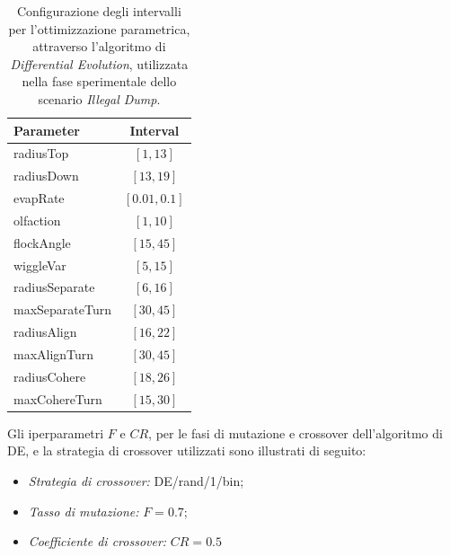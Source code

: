 \begin{table}[H]
    \centering
    \captionsetup{justification=centering, margin=2cm, font=footnotesize}
    \begin{tabular}{|l|c|}
    \hline
    \textbf{Parameter}              & \textbf{Interval}                 \\ \hline
    radiusTop                       & $[1,13]$                          \\ \hline
    radiusDown                      & $[13,19]$                         \\ \hline
    evapRate                        & $[0.01,0.1]$                      \\ \hline
    olfaction                       & $[1,10]$                          \\ \hline
    flockAngle                      & $[15,45]$                         \\ \hline
    wiggleVar                       & $[5,15]$                          \\ \hline
    radiusSeparate                  & $[6,16]$                          \\ \hline
    maxSeparateTurn                 & $[30,45]$                         \\ \hline
    radiusAlign                     & $[16,22]$                         \\ \hline
    maxAlignTurn                    & $[30,45]$                         \\ \hline
    radiusCohere                    & $[18,26]$                         \\ \hline
maxCohereTurn                       & $[15,30]$                         \\ \hline
    \end{tabular}%
    
    \caption{Configurazione degli intervalli per l'ottimizzazione parametrica, attraverso l'algoritmo di \textit{Differential Evolution}, utilizzata nella fase sperimentale dello scenario \textit{Illegal Dump}.}
    \label{tabella_intervalli_dump_sciadro32}
\end{table}

Gli iperparametri $F$ e $CR$, per le fasi di mutazione e crossover dell'algoritmo di DE, e la strategia di crossover utilizzati sono illustrati di seguito:
\begin{itemize}
    \item \textit{Strategia di crossover:} DE/rand/1/bin;
    \item \textit{Tasso di mutazione:} $F=0.7$;
    \item \textit{Coefficiente di crossover:} $CR=0.5$
\end{itemize}

